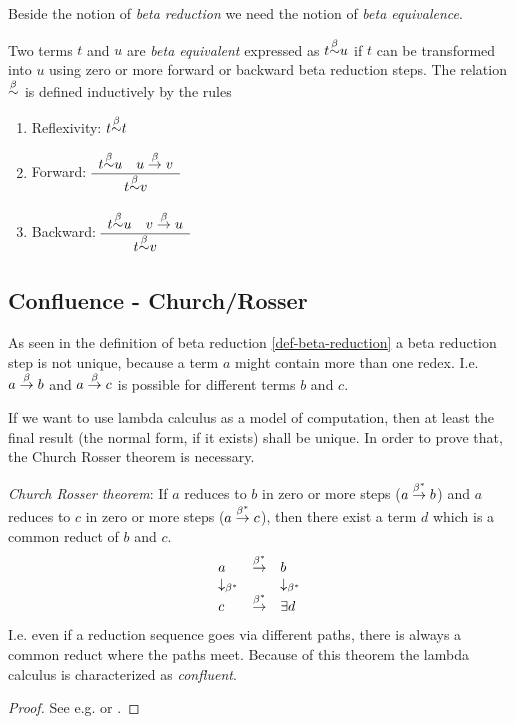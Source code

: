 \documentclass[12pt]{article}
\begin{document}
Beside the notion of \emph{beta reduction} we need the notion of \emph{beta
equivalence}.

\begin{definition}
    Two terms $t$ and $u$ are
    \emph{beta equivalent}
    \label{def-beta-equivalence}
    expressed as $t {\stackrel \beta \sim} u$ if $t$ can be transformed into $u$ using zero or
    more forward or backward beta reduction steps. The relation ${\stackrel \beta \sim}$ is
    defined inductively by the rules
    \begin{enumerate}
        \item Reflexivity: $t {\stackrel \beta \sim} t$

        \item Forward:
            $\begin{array}{c} t {\stackrel \beta \sim} u \quad u \stackrel{\beta}\to v \\ \hline t {\stackrel \beta \sim} v \end{array}$

        \item Backward:
            $\begin{array}{c} t {\stackrel \beta \sim} u \quad v \stackrel{\beta}\to u \\ \hline t {\stackrel \beta \sim} v \end{array}$
    \end{enumerate}
\end{definition}





\subsection{Confluence - Church/Rosser}

As seen in the definition of beta reduction \ref{def-beta-reduction} a beta
reduction step is not unique, because a term $a$ might contain more than one
redex. I.e. $a \stackrel{\beta}\to b$ and $a \stackrel{\beta}\to c$ is possible for different terms $b$
and $c$.

If we want to use lambda calculus as a model of computation, then at least the
final result (the normal form, if it exists) shall be unique. In order to prove
that, the Church Rosser theorem is necessary.
%
\begin{theorem}
    \emph{Church Rosser theorem}:
    \label{thm-church-rosser}
    If $a$ reduces to $b$ in zero or more steps ($a \stackrel{\beta^*}\to b$) and $a$
    reduces to $c$ in zero or more steps ($a \stackrel{\beta^*}\to c$), then there exist a
    term $d$ which is a common reduct of $b$ and $c$.
    $$
    {
        \def\down{\downarrow_{\beta^*}}
        \vertlist{
            a      & \reducestar & b
            \\
            \down  &             & \down
            \\
            c      & \reducestar & \exists d
        }
    }
    $$
    I.e. even if a reduction sequence goes via different paths, there is always
    a common reduct where the paths meet. Because of this theorem the lambda
    calculus is characterized as \emph{confluent}.

    \begin{proof}
        See e.g. \cite{brandl-lambda-step-by-step} or \cite{Barendregt84}.
    \end{proof}
\end{theorem}
\end{document}
